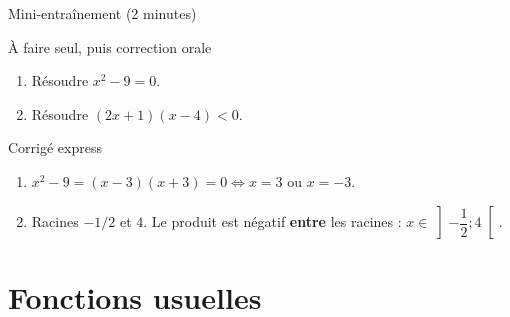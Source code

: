 \documentclass[10pt,aspectratio=169]{beamer}
\numberwithin{dummy}{section}
\begin{document}
\begin{frame}{Mini-entraînement (2 minutes)}
\begin{alertblock}{À faire seul, puis correction orale}
\begin{enumerate}
    \item Résoudre $x^2-9=0$.
    \item Résoudre $(2x+1)(x-4)<0$.
\end{enumerate}
\end{alertblock}

\vspace{0.4em}
\pause
\begin{block}{Corrigé express}
\begin{enumerate}
    \item $x^2-9=(x-3)(x+3)=0 \iff x=3$ ou $x=-3$.
    \item Racines $-1/2$ et $4$. Le produit est négatif \textbf{entre} les racines :
    $x\in \left]-\dfrac{1}{2};4\right[$.
\end{enumerate}
\end{block}
\end{frame}

\section{Fonctions usuelles}
\end{document}
